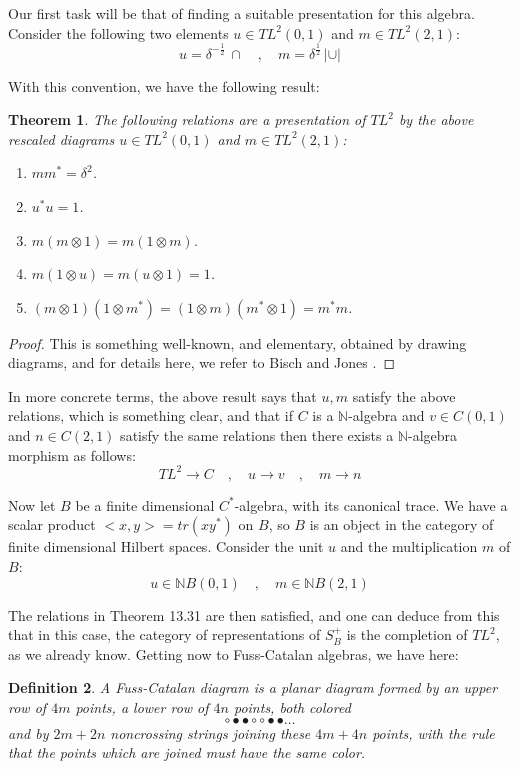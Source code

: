 \documentclass[12pt]{amsbook}
\newtheorem{theorem}{Theorem}[chapter]
\newtheorem{definition}[theorem]{Definition}
\begin{document}
Our first task will be that of finding a suitable presentation for this algebra. Consider the following two elements $u\in TL^2(0,1)$ and $m\in TL^2(2,1)$:
$$u=\delta^{-\frac{1}{2}}\,\cap
\quad,\quad
m=\delta^{\frac{1}{2}}\,|\cup|$$ 

With this convention, we have the following result:

\begin{theorem}
The following relations are a presentation of $TL^2$ by the above rescaled diagrams $u\in TL^2(0,1)$ and $m\in TL^2(2,1)$:
\begin{enumerate}
\item $mm^*=\delta^2$.

\item $u^*u=1$.

\item $m(m\otimes1)=m(1\otimes m)$.

\item $m(1\otimes u)=m(u\otimes1)=1$.

\item $(m\otimes1)(1\otimes m^*)=(1\otimes m)(m^*\otimes1)=m^*m$.
\end{enumerate}
\end{theorem}

\begin{proof}
This is something well-known, and elementary, obtained by drawing diagrams, and for details here, we refer to Bisch and Jones \cite{bjo}.
\end{proof}

In more concrete terms, the above result says that $u,m$ satisfy the above relations, which is something clear, and that if $C$ is a $\mathbb N$-algebra and $v\in C(0,1)$ and $n\in C(2,1)$ satisfy the same relations then there exists a $\mathbb N$-algebra morphism as follows:
$$TL^2\to C\quad,\quad 
u\to v\quad,\quad 
m\to n$$

Now let $B$ be a finite dimensional $C^*$-algebra, with its canonical trace. We have a scalar product $<x,y>=tr(xy^*)$ on $B$, so $B$ is an object in the category of finite dimensional Hilbert spaces. Consider the unit $u$ and the multiplication $m$ of $B$:
$$u\in\mathbb NB(0,1)\quad,\quad 
m\in\mathbb NB(2,1)$$

The relations in Theorem 13.31 are then satisfied, and one can deduce from this that in this case, the category of representations of $S_B^+$ is the completion of $TL^2$, as we already know. Getting now to Fuss-Catalan algebras, we have here:

\begin{definition}
A Fuss-Catalan diagram is a planar diagram formed by an upper row of $4m$ points, a lower row of $4n$ points, both colored
$$\circ\bullet\bullet\circ\circ\bullet\bullet\ldots$$
and by $2m+2n$ noncrossing strings joining these $4m+4n$ points, with the rule that the points which are joined must have the same color.
\end{definition}
\end{document}
